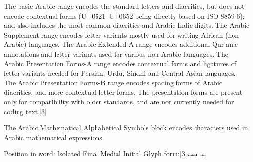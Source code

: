 The basic Arabic range encodes the standard letters and diacritics, but does not encode contextual forms (U+0621–U+0652 being directly based on ISO 8859-6); and also includes the most common diacritics and Arabic-Indic digits. The Arabic Supplement range encodes letter variants mostly used for writing African (non-Arabic) languages. The Arabic Extended-A range encodes additional Qur'anic annotations and letter variants used for various non-Arabic languages. The Arabic Presentation Forms-A range encodes contextual forms and ligatures of letter variants needed for Persian, Urdu, Sindhi and Central Asian languages. The Arabic Presentation Forms-B range encodes spacing forms of Arabic diacritics, and more contextual letter forms. The presentation forms are present only for compatibility with older standards, and are not currently needed for coding text.[3] 

The Arabic Mathematical Alphabetical Symbols block encodes characters used in Arabic mathematical expressions.


Position in word:	Isolated	Final	Medial	Initial
Glyph form:\scalebox{3}[3]{ب}{ـب}‎	ـبـ‎	 \scalebox{3}{بـ}

\begin{multicols}{2}
\end{multicols}


